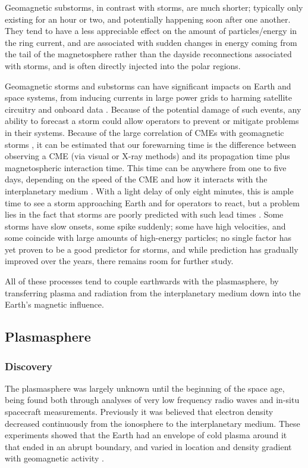 Geomagnetic substorms, in contrast with storms, are much shorter; typically only existing for an hour or two, and potentially happening soon after one another. They tend to have a less appreciable effect on the amount of particles/energy in the ring current, and are associated with sudden changes in energy coming from the tail of the magnetosphere rather than the dayside reconnections associated with storms, and is often directly injected into the polar regions.


Geomagnetic storms and substorms can have significant impacts on Earth and space systems, from inducing currents in large power grids to harming satellite circuitry and onboard data \cite{1989Storm}. Because of the potential damage of such events, any ability to forecast a storm could allow operators to prevent or mitigate problems in their systems. Because of the large correlation of CMEs with geomagnetic storms \cite{Yermolaev}, it can be estimated that our forewarning time is the difference between observing a CME (via visual or X-ray methods) and its propagation time plus magnetospheric interaction time. This time can be anywhere from one to five days, depending on the speed of the CME and how it interacts with the interplanetary medium \cite{StormSources}. With a light delay of only eight minutes, this is ample time to see a storm approaching Earth and for operators to react, but a problem lies in the fact that storms are poorly predicted with such lead times \cite{WeigelDecision}. Some storms have slow onsets, some spike suddenly; some have high velocities, and some coincide with large amounts of high-energy particles; no single factor has yet proven to be a good predictor for storms, and while prediction has gradually improved over the years, there remains room for further study. 

All of these processes tend to couple earthwards with the plasmasphere, by transferring plasma and radiation from the interplanetary medium down into the Earth's magnetic influence. 

\subsection{Plasmasphere}

\subsubsection{Discovery}
The plasmasphere was largely unknown until the beginning of the space age, being found both through analyses of very low frequency radio waves and in-situ spacecraft measurements. Previously it was believed that electron density decreased continuously from the ionosphere to the interplanetary medium. These experiments showed that the Earth had an envelope of cold plasma around it that ended in an abrupt boundary, and varied in location and density gradient with geomagnetic activity \cite{EarthsPlasmasphere}.

